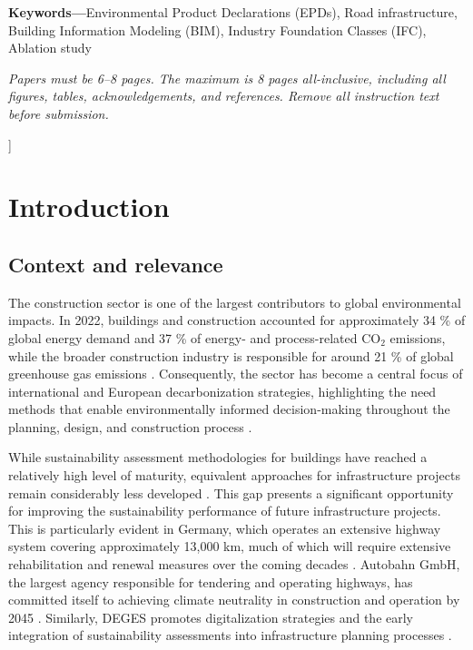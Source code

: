 \documentclass[10pt, a4paper, twocolumn]{article}
\begin{document}
{\begin{@twocolumnfalse}
  \vspace{6pt}

  \noindent\textbf{Keywords---}Environmental Product Declarations (EPDs), Road infrastructure, Building Information Modeling (BIM), Industry Foundation Classes (IFC), Ablation study

  \vspace{8pt}

  {\small\itshape
    Papers must be 6--8 pages. The maximum is 8 pages all-inclusive, including
    all figures, tables, acknowledgements, and references. Remove all instruction
    text before submission.
  \par}

  \vspace{10pt}

\end{@twocolumnfalse}
}]

\section{Introduction}

\subsection{Context and relevance}

The construction sector is one of the largest  contributors to global environmental impacts. In 2022, buildings and construction accounted for approximately 34 \% of global energy demand and 37 \% of energy- and process-related CO$_2$ emissions, while the broader construction industry is responsible for around 21 \% of global greenhouse gas emissions \cite{UN report}. Consequently, the sector has become a central focus of international and European decarbonization strategies, highlighting the need methods that enable environmentally informed decision-making throughout the planning, design,  and construction process \cite{Chen.2024}.

While sustainability assessment methodologies for buildings have reached a relatively high level of maturity, equivalent approaches for infrastructure projects remain considerably less developed \cite{Milic2024}. This gap presents a significant opportunity for improving the sustainability performance of future infrastructure projects. This is particularly evident in Germany, which operates an extensive highway system covering approximately 13,000 km, much of which will require extensive rehabilitation and renewal measures over the coming decades \cite{FederalMinistryofTransport.2025}. Autobahn GmbH, the largest agency responsible for tendering and operating highways, has committed itself to achieving climate neutrality in construction and operation by 2045 \cite{AutobahnGmbH.}. Similarly, DEGES promotes digitalization strategies and the early integration of sustainability assessments into infrastructure planning processes \cite{DEGES.2025}.
\end{document}
